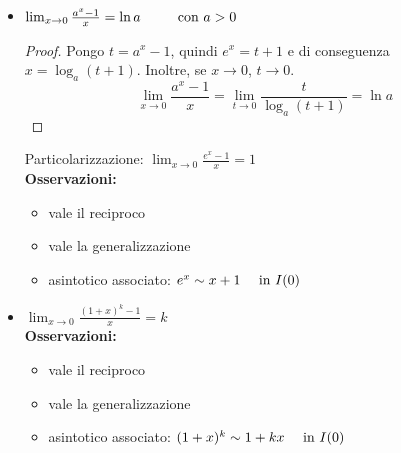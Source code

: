 \begin{itemize}
\item {$\lim_{x\to 0}\frac{a^x-1}{x}=\ln a~~~~~~~~\textnormal{con }a>0$}
\begin{proof}
Pongo $t=a^x-1$, quindi $e^x=t+1$ e di conseguenza $x=\log_a (t+1)$. Inoltre, se $x\to 0$, $t\to 0$.
\[\lim_{x\to 0}\frac{a^x-1}{x}=\lim_{t\to 0}\frac{t}{\log_a (t+1)}=\ln a\]
\end{proof}
Particolarizzazione: $\lim_{x\to 0}\frac{e^x-1}{x}=1$~\vspace{10pt}\\
\textbf{Osservazioni:}
\begin{itemize}
    \item vale il reciproco
    \item vale la generalizzazione
    \item asintotico associato: $e^x \sim x + 1 ~~~~\textnormal{in } I(0)$
\end{itemize}

\item {$\lim_{x\to 0}\frac{(1+x)^k-1}{x}=k$}~\vspace{10pt}\\
\textbf{Osservazioni:}
\begin{itemize}
    \item vale il reciproco
    \item vale la generalizzazione
    \item asintotico associato: $(1+x)^k \sim 1+kx ~~~~\textnormal{in } I(0)$
\end{itemize}
\end{itemize}
